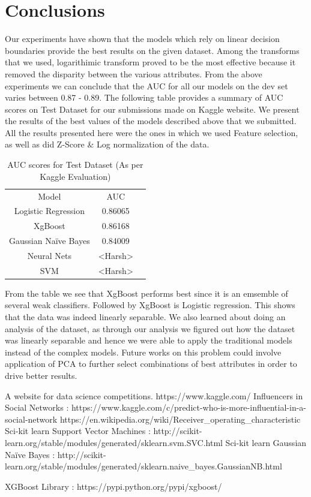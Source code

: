 \documentclass[conference]{IEEEtran}
\numberwithin{equation}{section}
\numberwithin{figure}{section}
\numberwithin{table}{section}
\begin{document}
\section{Conclusions}
Our experiments have shown that the models which rely on linear decision boundaries provide the best results on the given dataset. Among the transforms that we used, logarithimic transform proved to be the most effective because it removed the disparity between the various attributes. From the above experiments we can conclude that the AUC for all our models on the dev set varies between 0.87 - 0.89.
The following table provides a summary of AUC scores on Test Dataset for our submissions made on Kaggle website. We present the results of the best values of the models described above that we submitted. All the results presented here were the ones in which we used Feature selection, as well as did Z-Score \& Log normalization of the data.
\begin{table}[!htb]
\centering
\caption{AUC scores for Test Dataset (As per Kaggle Evaluation)}
\label{tab_lr}
\begin{tabular}{ c c c }
 \noalign{\smallskip}\hline\noalign{\smallskip}
   Model  & AUC \\
 \noalign{\smallskip}\hline\noalign{\smallskip}
 Logistic Regression & 0.86065\\
 XgBoost & 0.86168\\
 Gaussian Na{\"i}ve Bayes & 0.84009\\
 Neural Nets & <Harsh>\\
 SVM & <Harsh> \\
 \end{tabular}
\end{table}

From the table we see that XgBoost performs best since it is an emsemble of several weak classifiers. Followed by XgBoost is Logistic regression. This shows that the data was indeed linearly separable. We also learned about doing an analysis of the dataset, as through our analysis we figured out how the dataset was linearly separable and hence we were able to apply the traditional models instead of the complex models.
Future works on this problem could involve application of PCA to further select combinations of best attributes in order to drive better results.

\begin{thebibliography}{1}
A website for data science competitions. https://www.kaggle.com/
Influencers in Social Networks : https://www.kaggle.com/c/predict-who-is-more-influential-in-a-social-network
https://en.wikipedia.org/wiki/Receiver\_operating\_characteristic
Sci-kit learn Support Vector Machines : http://scikit-learn.org/stable/modules/generated/sklearn.svm.SVC.html
Sci-kit learn Gaussian Na{\"i}ve Bayes : http://scikit-learn.org/stable/modules/generated/sklearn.naive\_bayes.GaussianNB.html

XGBoost Library : https://pypi.python.org/pypi/xgboost/
\end{thebibliography}

\end{document}
